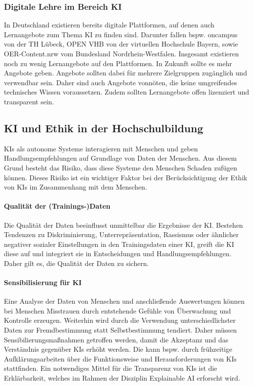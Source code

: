 \subsubsection*{Digitale Lehre im Bereich KI}
In Deutschland existieren bereits digitale Plattformen, auf denen auch Lernangebote zum Thema KI zu finden sind.
Darunter fallen bspw. oncampus von der TH Lübeck, OPEN VHB von der virtuellen Hochschule Bayern, sowie OER-Content.nrw vom Bundesland Nordrhein-Westfalen.
Insgesamt existieren noch zu wenig Lernangebote auf den Plattformen. In Zukunft sollte es mehr Angebote geben.
Angebote sollten dabei für mehrere Zielgruppen zugänglich und verwendbar sein. Daher sind auch Angebote vonnöten, die keine umgreifendes technisches Wissen voraussetzen.
Zudem sollten Lernangebote offen lizenziert und transparent sein. \cite*[S. 28ff.]{Witt.2020}

\subsection{KI und Ethik in der Hochschulbildung}
KIs als autonome Systeme interagieren mit Menschen und geben Handlungsempfehlungen auf Grundlage von Daten der Menschen.
Aus diesem Grund besteht das Risiko, dass diese Systeme den Menschen Schaden zufügen können.
Dieses Risiko ist ein wichtiger Faktor bei der Berücksichtigung der Ethik von KIs im Zusammenhang mit dem Menschen. \cite*[S. 38]{Witt.2020}

\paragraph*{Qualität der (Trainings-)Daten} 
Die Qualität der Daten beeinflusst unmittelbar die Ergebnisse der KI.
Bestehen Tendenzen zu Diskriminierung, Unterrepräsentation, Rassismus oder ähnlicher negativer sozialer Einstellungen in den Trainingsdaten einer KI, greift die KI diese auf und integriert sie in Entscheidungen und Handlungsempfehlungen.
Daher gilt es, die Qualität der Daten zu sichern. \cite*[S. 39]{Witt.2020}

\paragraph*{Sensibilisierung für KI} 
Eine Analyse der Daten von Menschen und anschließende Auswertungen können bei Menschen Misstrauen durch entstehende Gefühle von Überwachung und Kontrolle erzeugen.
Weiterhin wird durch die Verwendung unterschiedlichster Daten zur Fremdbestimmung statt Selbstbestimmung tendiert.
Daher müssen Sensibilierungsmaßnahmen getroffen werden, damit die Akzeptanz und das Verständnis gegenüber KIs erhöht werden.
Die kann  bspw. durch frühzeitige Aufklärungsarbeiten über die Funktionsweise und Herausforderungen von KIs stattfinden.
Ein notwendiges Mittel für die Transparenz von KIs ist die Erklärbarkeit, welches im Rahmen der Disziplin Explainable AI erforscht wird. \cite*[S. 39ff.]{Witt.2020}

